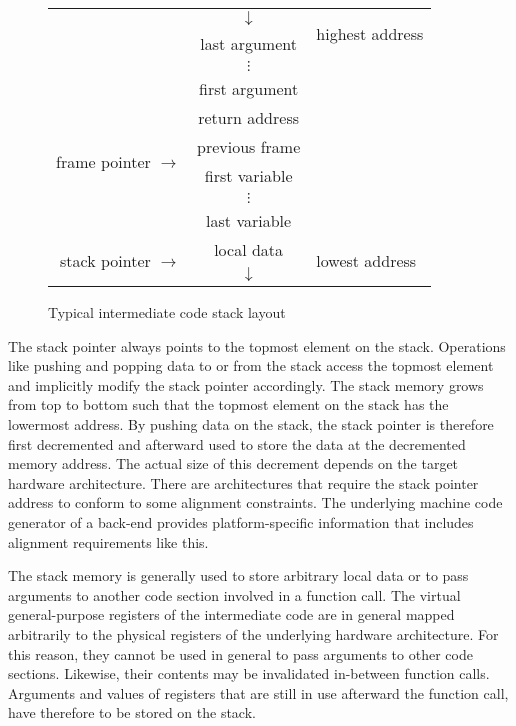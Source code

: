 \begin{figure}
\centering
\sffamily\begin{tabular}{r|c|l}
& $\downarrow$ & \multirow{2}{*}{highest address} \\
\cline{2-2} & last argument \\ & $\vdots$ \\ & first argument \\
\cline{2-2} & return address \\
\cline{2-2} \multirow{2}{*}{frame pointer $\rightarrow$} & previous frame \\
\cline{2-2} & first variable \\ & $\vdots$ \\ & last variable \\
\cline{2-2} \multirow{2}{*}{stack pointer $\rightarrow$} & local data & \multirow{2}{*}{lowest address} \\
\cline{2-2} & $\downarrow$ \\
\end{tabular}\normalfont
\caption{Typical intermediate code stack layout}
\label{fig:cdstackframe}
\end{figure}

The stack pointer always points to the topmost element on the stack.
Operations like pushing and popping data to or from the stack access the topmost element and implicitly modify the stack pointer accordingly.
The stack memory grows from top to bottom such that the topmost element on the stack has the lowermost address.
By pushing data on the stack, the stack pointer is therefore first decremented and afterward used to store the data at the decremented memory address.
The actual size of this decrement depends on the target hardware architecture.
There are architectures that require the stack pointer address to conform to some alignment constraints.
The underlying machine code generator of a back-end provides platform-specific information that includes alignment requirements like this.

The stack memory is generally used to store arbitrary local data or to pass arguments to another code section involved in a function call.
The virtual general-purpose registers of the intermediate code are in general mapped arbitrarily to the physical registers of the underlying hardware architecture.
For this reason, they cannot be used in general to pass arguments to other code sections.
Likewise, their contents may be invalidated in-between function calls.
Arguments and values of registers that are still in use afterward the function call, have therefore to be stored on the stack.

